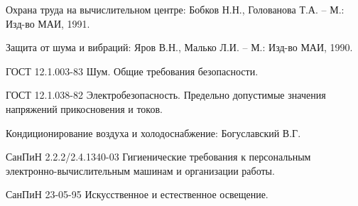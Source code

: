 \item Охрана труда на вычислительном центре: Бобков Н.Н., Голованова Т.А. – М.: Изд-во МАИ, 1991.
\item Защита от шума и вибраций: Яров В.Н., Малько Л.И. – М.: Изд-во МАИ, 1990.
\item ГОСТ 12.1.003-83 Шум. Общие требования безопасности.
\item ГОСТ 12.1.038-82 Электробезопасность. Предельно допустимые значения напряжений прикосновения и токов.
\item Кондиционирование воздуха и холодоснабжение: Богуславский В.Г.
\item СанПиН 2.2.2/2.4.1340-03 Гигиенические требования к персональным электронно-вычислительным машинам и организации работы.
\item СанПиН 23-05-95 Искусственное и естественное освещение.
